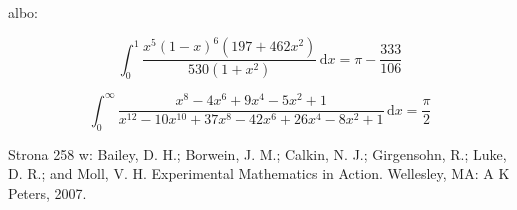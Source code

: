 albo:

\begin{problem}
\begin{equation}
    \int_0^1 \frac{x^5 ( 1-x)^6 (197 + 462 x^2)}{530 (1+x^2)} \,\mathrm{d}x = \pi - \frac{333}{106}
\end{equation}
\end{problem}


\begin{problem}
\begin{equation}
    \int_0^\infty \frac{x^8-4x^6+9x^4-5x^2+1}{x^{12}-10x^{10}+37x^8-42x^6+26x^4-8x^2+1} \,\mathrm{d}x = \frac{\pi}{2}
\end{equation}
\end{problem}

\begin{solution}
    Strona 258 w: Bailey, D. H.; Borwein, J. M.; Calkin, N. J.; Girgensohn, R.; Luke, D. R.; and Moll, V. H. Experimental Mathematics in Action. Wellesley, MA: A K Peters, 2007.
\end{solution}

%